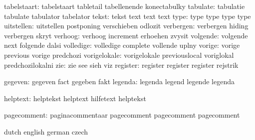         tabelstaart:  tabelstaart          tabletail           tabellenende
                      konectabulky
           tabulate:  tabulatie            tabulate            tabulator
                      tabelator
              tekst:  tekst                text                text
                      text
               type:  type                 type                type
                      type
         uitstellen:  uitstellen           postponing          verschieben
                      odlozit
          verbergen:  verbergen            hiding              verbergen
                      skryt
            verhoog:  verhoog              increment           erhoehen
                      zvysit
           volgende:  volgende             next                folgende
                      dalsi
          volledige:  volledige            complete            vollende
                      uplny
             vorige:  vorige               previous            vorige
                      predchozi
       vorigelokale:  vorigelokale         previouslocal       voriglokal
                      predchozilokalni
                zie:  zie                  see                 sieh
                      viz
           register:  register             register            register
                      rejstrik

            gegeven:  gegeven              fact                gegeben
                      fakt
            legenda:  legenda              legend              legende
                      legenda

           helptext:  helptekst            helptext            hilfetext
                      helptekst %

        pagecomment:  paginacommentaar     pagecomment         pagecomment 
                      pagecomment %

\stopelements




\startvariables      dutch             english              german
                     czech

